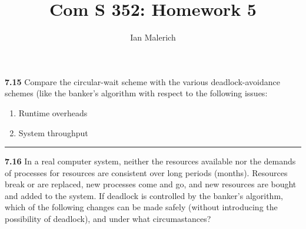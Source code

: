 \documentclass[12pt]{jhwhw}
\author{Ian Malerich}
\title{Com S 352: Homework 5}
\begin{document}
\raggedright

\textbf{7.15}  
	Compare the circular-wait scheme with the various deadlock-avoidance schemes 
	(like the banker's algorithm with respect to the following issues:
	\begin{enumerate}
		\item Runtime overheads
		\item System throughput
	\end{enumerate}
\textcolor[RGB]{240,240,240}{\rule{\textwidth}{0.5pt}}\bigbreak

	\begin{addmargin}[1em]{}
	\end{addmargin}

\clearpage
\textbf{7.16}  
	In a real computer system, neither the resources available nor the demands of processes for resources are 
	consistent over long periods (months). Resources break or are replaced, new processes come and go, and new 
	resources are bought and added to the system. If deadlock is controlled by the banker's algorithm,
	which of the following changes can be made safely (without introducing the possibility of deadlock),
	and under what circumastances?
\end{document}

